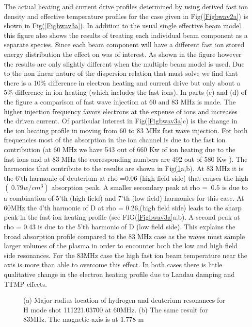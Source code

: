  The actual heating and current drive profiles determined by using \ot
 derived fast ion density and effective temperature profiles for the
 case given in 
 Fig(\ref{Figbwav2a}) is  shown in Fig(\ref{Figbwav3a}). In addition to the usual
 single effective beam model this figure also shows the results of
 treating each individual beam component  as a separate species. Since
 each beam component will have a different fast ion stored energy
 distribution the effect on \ct was of interest. As shown in the
 figure however the results are only slightly  different when the
 multiple beam model is used. Due to the non linear nature of the
 dispersion relation that \ct must solve we find that there is a 10\%
 difference in electron heating and current drive but only about a 5\%
 difference in ion heating (which includes the fast ions). In parts
 (c) and (d) of the figure a comparison of fast wave injection at 60
 and 83 MHz is made. The higher injection frequency favors electrons
 at the expense of ions and increases the driven current.  Of
 particular interest in Fig(\ref{Figbwav3a}c) is the change in the ion
 heating profile in moving from 60 to 83 MHz fast wave injection.
 For both frequencies most of the absorption in the ion channel is
 due to the fast ion contribution (at 60 MHz we have 543 out of 660 Kw
 of ion heating due to the fast ions and at 83 MHz the corresponding
 numbers are 492 out of 580 Kw ). The harmonics that contribute to the
 results are shown in Fig(\ref{h1}a,b). At 83 MHz it is the 6'th harmonic of
 deuterium at rho =0.06 (high field side) that causes the high $(~0.79
 w/cm^3)$ absorption peak. A smaller  secondary peak at rho = $~0.5$
 is due to a combination of 5'th (high field) and 7'th (low field)
 harmonics for this case.  At 60MHz the 4'th harmonic of D at rho =
 0.26,(high field side) leads to the sharp peak in the fast ion
 heating profile (see FIG(\ref{Figbwav3a}a,b). A second peak at rho =
 0.43 is due to the 5'th harmonic of D (low field side).  This
 explains the broad absorption profile compared to the 83 MHz case as
 the waves must sample larger volumes of the plasma in order to
 encounter both the low and high field side resonances. For the 83MHz
 case the high fast ion beam temperature near the axis is
 more than able to overcome this effect. In both cases there
 is little qualitative change in the electron heating profile due to
 Landau damping and TTMP effects. 
 \begin{figure}[hbt] %
 \centering 
\begin{narrow}{-.50in}{0in}   
 \mbox{}
\end{narrow}
 \caption{(a) Major radius location of hydrogen and  deuterium
   resonances for H mode shot 111221.03700  at 60MHz. 
    (b) The same result for 83MHz. The magnetic axis is at 1.778 m}
  \label{h1}
 \end{figure}

